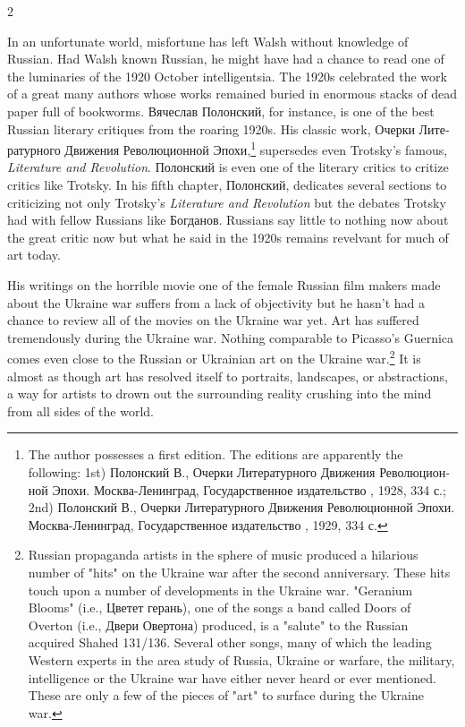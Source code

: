 \documentclass[10pt,a4paper,twoside]{article} %
\begin{document}
\begin{multicols}{2}
{\newline \indent In an unfortunate world, misfortune has left Walsh without knowledge of Russian. Had Walsh known Russian, he might have had a chance to read one of the luminaries of the 1920 October intelligentsia. The 1920s celebrated the work of a great many authors whose works remained buried in enormous stacks of dead paper full of bookworms. \textrussian{Вячеслав Полонский}, for instance, is one of the best Russian literary critiques from the roaring 1920s. His classic work, \textrussian{Очерки Литературного Движения Революционной Эпохи},\footnote{The author possesses a first edition. The editions are apparently the following: 1st) \textrussian{Полонский В., Очерки Литературного Движения Революционной Эпохи. Москва-Ленинград, Государственное издательство , 1928, 334 с.}; 2nd) \textrussian{Полонский В., Очерки Литературного Движения Революционной Эпохи. Москва-Ленинград, Государственное издательство , 1929, 334 с.}} supersedes even Trotsky's famous, \emph{Literature and Revolution}. \textrussian{Полонский} is even one of the literary critics to critize critics like Trotsky. In his fifth chapter, \textrussian{Полонский}, dedicates several sections to criticizing not only Trotsky's \emph{Literature and Revolution} but the debates Trotsky had with fellow Russians like \textrussian{Богданов}. Russians say little to nothing now about the great critic now but what he said in the 1920s remains revelvant for much of art today. 

\newline \indent His writings on the horrible movie one of the female Russian film makers made about the Ukraine war suffers from a lack of objectivity but he hasn't had a chance to review all of the movies on the Ukraine war yet. Art has suffered tremendously during the Ukraine war. Nothing comparable to Picasso's Guernica comes even close to the Russian or Ukrainian art on the Ukraine war.\footnote{Russian propaganda artists in the sphere of music produced a hilarious number of "hits" on the Ukraine war after the second anniversary. These hits touch upon a number of developments in the Ukraine war. "Geranium Blooms" (i.e., \textrussian{Цветет герань}), one of the songs a band called Doors of Overton (i.e., \textrussian{Двери Овертона}) produced, is a "salute" to the Russian acquired Shahed 131/136. Several other songs, many of which the leading Western experts in the area study of Russia, Ukraine or warfare, the military, intelligence or the Ukraine war have either never heard or ever mentioned. These are only a few of the pieces of "art" to surface during the Ukraine war.} It is almost as though art has resolved itself to portraits, landscapes, or abstractions, a way for artists to drown out the surrounding reality crushing into the mind from all sides of the world. 

}
\end{multicols}
\end{document}
